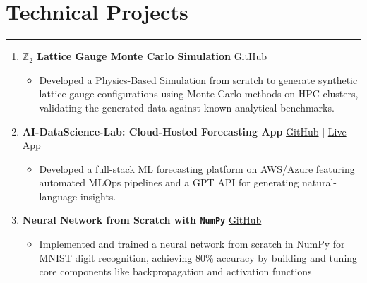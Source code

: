 \documentclass[11pt]{article}
\begin{document}
\section*{Technical Projects}
\hrule
\vspace{-0.3em}
\begin{enumerate}
    \item \textbf{$\mathbb{Z}_2$ Lattice Gauge Monte Carlo Simulation}  
    \hfill \href{https://github.com/Hariprashad-Ravikumar/Z2_LatticeGauge_Monte_Carlo_Simulation}{GitHub} \\
    \vspace{-2em}
    \begin{itemize}
         \item Developed a Physics-Based Simulation from scratch to generate synthetic lattice gauge configurations using Monte Carlo methods on HPC clusters, validating the generated data against known analytical benchmarks.
    \end{itemize}
    \item \textbf{AI-DataScience-Lab: Cloud-Hosted Forecasting App}  
    \hfill \href{https://github.com/Hariprashad-Ravikumar/AI-DataScience-Lab}{GitHub} $|$ \href{https://hariprashad-ravikumar.github.io/AI-DataScience-Lab}{Live App} \\
    \vspace{-2em}
    \begin{itemize}
    \item Developed a full-stack ML forecasting platform on AWS/Azure featuring automated MLOps pipelines and a GPT API for generating natural-language insights.
    \end{itemize}
    \item \textbf{Neural Network from Scratch with \texttt{NumPy}}  
    \hfill \href{https://github.com/Hariprashad-Ravikumar/Neural-Network-from-Scratch-with-NumPy}{GitHub} \\
    \vspace{-2em}
    \begin{itemize}
        \item Implemented and trained a neural network from scratch in NumPy for MNIST digit recognition, achieving 80\% accuracy by building and tuning core components like backpropagation and activation functions
    \end{itemize}
\end{enumerate}

\end{document}
